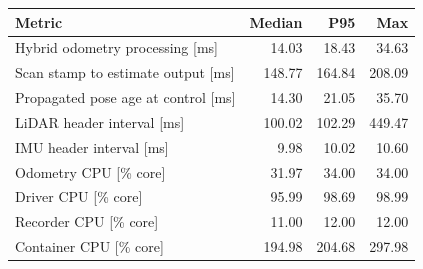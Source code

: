 \begin{tabular}{lrrr}
\hline
Metric & Median & P95 & Max \\
\hline
Hybrid odometry processing [ms] & 14.03 & 18.43 & 34.63 \\
Scan stamp to estimate output [ms] & 148.77 & 164.84 & 208.09 \\
Propagated pose age at control [ms] & 14.30 & 21.05 & 35.70 \\
LiDAR header interval [ms] & 100.02 & 102.29 & 449.47 \\
IMU header interval [ms] & 9.98 & 10.02 & 10.60 \\
Odometry CPU [\% core] & 31.97 & 34.00 & 34.00 \\
Driver CPU [\% core] & 95.99 & 98.69 & 98.99 \\
Recorder CPU [\% core] & 11.00 & 12.00 & 12.00 \\
Container CPU [\% core] & 194.98 & 204.68 & 297.98 \\
\hline
\end{tabular}
